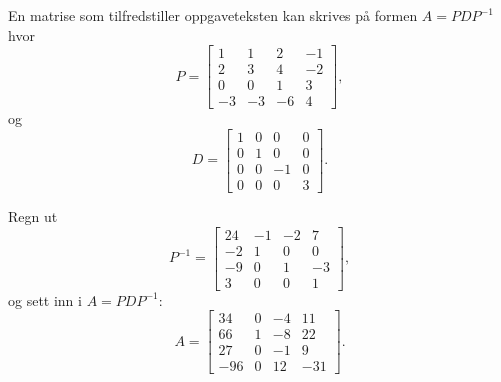 \documentclass[titlepage,a4paper,12pt,norsk]{IMFeksamen}
\newcommand{\0}{\V{0}}
\begin{document}
\begin{oppgave}
En matrise som tilfredstiller oppgaveteksten kan skrives på formen $A=PDP^{-1}$ hvor
\[
P=\begin{bmatrix}
1  & 1  & 2  & -1 \\
2  & 3  & 4  & -2 \\
0  & 0  & 1  & 3  \\
-3 & -3 & -6 & 4
\end{bmatrix},
\]
og
\[
D=\begin{bmatrix}
1 & 0 & 0  & 0 \\
0 & 1 & 0  & 0 \\
0 & 0 &-1  & 0  \\
0 & 0 & 0  & 3
\end{bmatrix}.
\]

Regn ut
\[
P^{-1}=\begin{bmatrix}
24 & -1 & -2 & 7  \\
-2 & 1  & 0  & 0  \\
-9 & 0  & 1  & -3 \\
3  & 0  & 0  & 1
\end{bmatrix},
\]
og sett inn i $A=PDP^{-1}$:
\[
A=\begin{bmatrix}
34  & 0 & -4 & 11 \\
66  & 1 & -8 & 22 \\
27  & 0 & -1 & 9  \\
-96 & 0 & 12 & -31
\end{bmatrix}.
\]


\end{oppgave}
\end{document}
